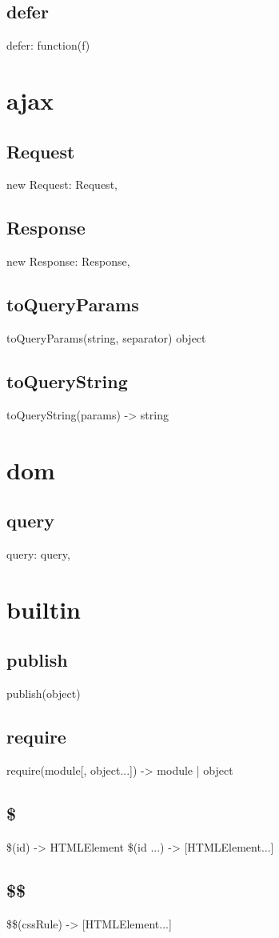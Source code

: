 {{{{{{{\subsection*{defer}
defer: function(f) {

\section{ajax}
\subsection*{Request}
new Request: Request,
\subsection*{Response}
new Response: Response,
\subsection*{toQueryParams}
toQueryParams(string, separator) \rightarrow object
\subsection*{toQueryString}
toQueryString(params) -> string

\section{dom}
\subsection*{query}
query: query,

\section{builtin}
\subsection*{publish}
publish(object)
\subsection*{require}
require(module[, object...]) -> module | object
\subsection*{\$}
\$(id) -> HTMLElement
\$(id ...) -> [HTMLElement...]
\subsection*{\$\$}
\$\$(cssRule) -> [HTMLElement...]
}}}}}}}}
